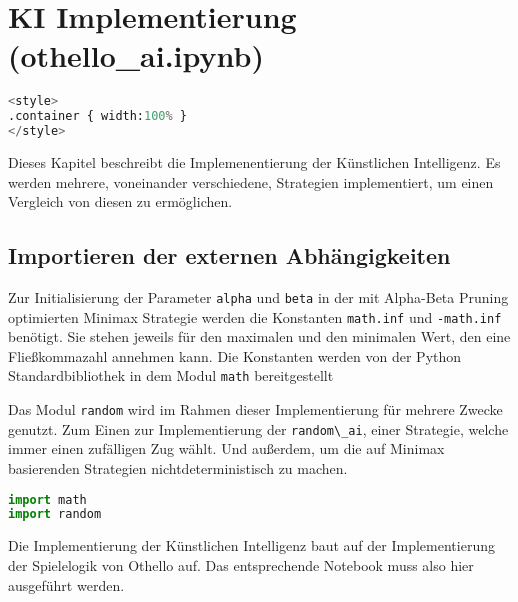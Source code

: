 \hypertarget{ki-implementierung-othello_ai.ipynb}{%
\section{KI Implementierung
(othello\_ai.ipynb)}\label{ki-implementierung-othello_ai.ipynb}}

\label{sec:aiimpl}

\begin{lstlisting}[language=Python]
%%HTML
<style>
.container { width:100% }
</style>
\end{lstlisting}

Dieses Kapitel beschreibt die Implemenentierung der Künstlichen
Intelligenz. Es werden mehrere, voneinander verschiedene, Strategien
implementiert, um einen Vergleich von diesen zu ermöglichen.

\hypertarget{importieren-der-externen-abhuxe4ngigkeiten}{%
\subsection{Importieren der externen
Abhängigkeiten}\label{importieren-der-externen-abhuxe4ngigkeiten}}

Zur Initialisierung der Parameter \passthrough{\lstinline!alpha!} und
\passthrough{\lstinline!beta!} in der mit Alpha-Beta Pruning optimierten
Minimax Strategie werden die Konstanten
\passthrough{\lstinline!math.inf!} und
\passthrough{\lstinline!-math.inf!} benötigt. Sie stehen jeweils für den
maximalen und den minimalen Wert, den eine Fließkommazahl annehmen kann.
Die Konstanten werden von der Python Standardbibliothek in dem Modul
\passthrough{\lstinline!math!} bereitgestellt

Das Modul \passthrough{\lstinline!random!} wird im Rahmen dieser
Implementierung für mehrere Zwecke genutzt. Zum Einen zur
Implementierung der \passthrough{\lstinline!random\_ai!}, einer
Strategie, welche immer einen zufälligen Zug wählt. Und außerdem, um die
auf Minimax basierenden Strategien nichtdeterministisch zu machen.

\begin{lstlisting}[language=Python]
import math
import random
\end{lstlisting}

Die Implementierung der Künstlichen Intelligenz baut auf der
Implementierung der Spielelogik von Othello auf. Das entsprechende
Notebook muss also hier ausgeführt werden.

\begin{lstlisting}[language=Python]
%run othello_game.ipynb
\end{lstlisting}

